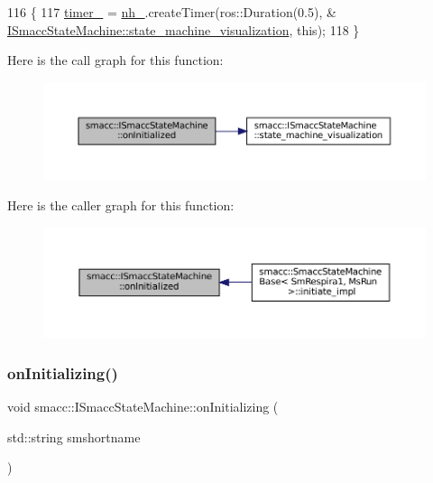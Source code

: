 \begin{DoxyCode}
116 \{
117     \hyperlink{classsmacc_1_1ISmaccStateMachine_ab6b00dc92aa86f1074d795fb4057e5bc}{timer\_} = \hyperlink{classsmacc_1_1ISmaccStateMachine_ad8877bcca9dbb345fe72cca839c93dd3}{nh\_}.createTimer(ros::Duration(0.5), &
      \hyperlink{classsmacc_1_1ISmaccStateMachine_ac03029f770422d0ea77ea9856b8cb1a8}{ISmaccStateMachine::state\_machine\_visualization}, \textcolor{keyword}{this});
118 \}
\end{DoxyCode}
Here is the call graph for this function\+:
\nopagebreak
\begin{figure}[H]
\begin{center}
\leavevmode
\includegraphics[width=350pt]{classsmacc_1_1ISmaccStateMachine_a95e7f71d0d88fffd0afebb1f9ccdade5_cgraph}
\end{center}
\end{figure}
Here is the caller graph for this function\+:
\nopagebreak
\begin{figure}[H]
\begin{center}
\leavevmode
\includegraphics[width=350pt]{classsmacc_1_1ISmaccStateMachine_a95e7f71d0d88fffd0afebb1f9ccdade5_icgraph}
\end{center}
\end{figure}
\mbox{\label{classsmacc_1_1ISmaccStateMachine_ae8c9c79ca6cd77c975f5d9cda33a6d5e}} 
\subsubsection{\texorpdfstring{on\+Initializing()}{onInitializing()}}
{\footnotesize\ttfamily void smacc\+::\+I\+Smacc\+State\+Machine\+::on\+Initializing (\begin{DoxyParamCaption}\item[{std\+::string}]{smshortname }\end{DoxyParamCaption})\hspace{0.3cm}{\ttfamily [protected]}}



